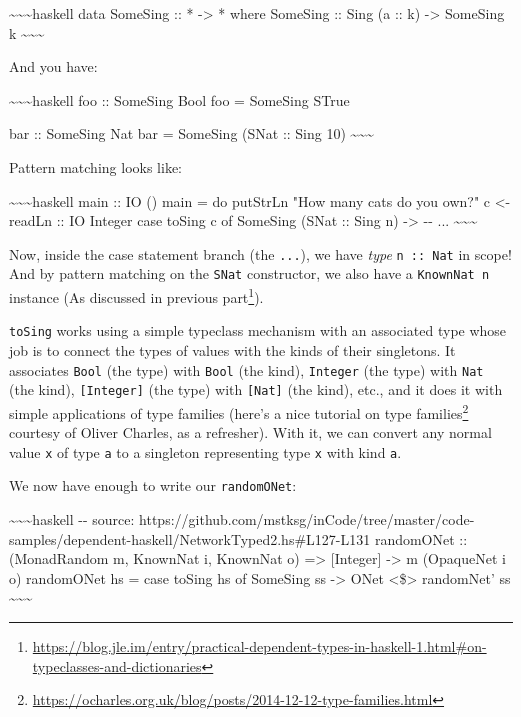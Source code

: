 \documentclass[]{article}
\renewcommand{\href}[2]{#2\footnote{\url{#1}}}
\begin{document}
\textasciitilde{}\textasciitilde{}\textasciitilde{}haskell data SomeSing :: *
-\textgreater{} * where SomeSing :: Sing (a :: k) -\textgreater{} SomeSing k
\textasciitilde{}\textasciitilde{}\textasciitilde{}

And you have:

\textasciitilde{}\textasciitilde{}\textasciitilde{}haskell foo :: SomeSing Bool
foo = SomeSing STrue

bar :: SomeSing Nat bar = SomeSing (SNat :: Sing 10)
\textasciitilde{}\textasciitilde{}\textasciitilde{}

Pattern matching looks like:

\textasciitilde{}\textasciitilde{}\textasciitilde{}haskell main :: IO () main =
do putStrLn "How many cats do you own?" c \textless{}- readLn :: IO Integer case
toSing c of SomeSing (SNat :: Sing n) -\textgreater{} -\/- ...
\textasciitilde{}\textasciitilde{}\textasciitilde{}

Now, inside the case statement branch (the \texttt{...}), we have \emph{type}
\texttt{n\ ::\ Nat} in scope! And by pattern matching on the \texttt{SNat}
constructor, we also have a \texttt{KnownNat\ n} instance (As discussed in
\href{https://blog.jle.im/entry/practical-dependent-types-in-haskell-1.html\#on-typeclasses-and-dictionaries}{previous
part}).

\texttt{toSing} works using a simple typeclass mechanism with an associated type
whose job is to connect the types of values with the kinds of their singletons.
It associates \texttt{Bool} (the type) with \texttt{Bool} (the kind),
\texttt{Integer} (the type) with \texttt{Nat} (the kind), \texttt{{[}Integer{]}}
(the type) with \texttt{{[}Nat{]}} (the kind), etc., and it does it with simple
applications of type families (here's a
\href{https://ocharles.org.uk/blog/posts/2014-12-12-type-families.html}{nice
tutorial on type families} courtesy of Oliver Charles, as a refresher). With it,
we can convert any normal value \texttt{x} of type \texttt{a} to a singleton
representing type \texttt{x} with kind \texttt{a}.

We now have enough to write our \texttt{randomONet}:

\textasciitilde{}\textasciitilde{}\textasciitilde{}haskell -\/- source:
https://github.com/mstksg/inCode/tree/master/code-samples/dependent-haskell/NetworkTyped2.hs\#L127-L131
randomONet :: (MonadRandom m, KnownNat i, KnownNat o) =\textgreater{}
{[}Integer{]} -\textgreater{} m (OpaqueNet i o) randomONet hs = case toSing hs
of SomeSing ss -\textgreater{} ONet \textless{}\$\textgreater{} randomNet' ss
\textasciitilde{}\textasciitilde{}\textasciitilde{}
\end{document}
